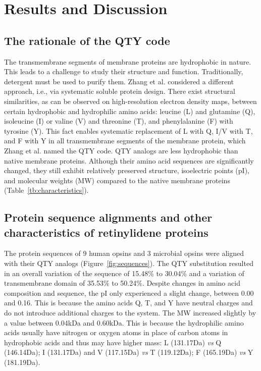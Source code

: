 \documentclass[fleqn, 10pt]{manuscript}
\begin{document}
\section*{Results and Discussion}

\subsection*{The rationale of the QTY code}

The transmembrane segments of membrane proteins are hydrophobic in nature. This leads to a challenge to study their structure and function. Traditionally, detergent must be used to purify them. Zhang et al. considered a different approach, i.e., via systematic soluble protein design. There exist structural similarities, as can be observed on high-resolution electron density maps, between certain hydrophobic and hydrophilic amino acids: leucine (L) and glutamine (Q), isoleucine (I) or valine (V) and threonine (T), and phenylalanine (F) with tyrosine (Y). This fact enables systematic replacement of L with Q, I/V with T, and F with Y in all transmembrane segments of the membrane protein, which Zhang et al. named the QTY code. QTY analogs are less hydrophobic than native membrane proteins. Although their amino acid sequences are significantly changed, they still exhibit relatively preserved structure, isoelectric points (pI), and molecular weights (MW) compared to the native membrane proteins (Table~\ref{tb:characteristics}). 

\subsection*{Protein sequence alignments and other characteristics of retinylidene proteins}

The protein sequences of 9 human opsins and 3 microbial opsins were aligned with their QTY analogs (Figure~\ref{fig:sequences}). The QTY substitution resulted in an overall variation of the sequence of 15.48\% to 30.04\% and a variation of transmembrane domain of 35.53\% to 50.24\%. Despite changes in amino acid composition and sequence, the pI only experienced a slight change, between 0.00 and 0.16. This is because the amino acids Q, T, and Y have neutral charges and do not introduce additional charges to the system.  The MW increased slightly by a value between 0.04kDa and 0.60kDa. This is because the hydrophilic amino acids usually have nitrogen or oxygen atoms in place of carbon atoms in hydrophobic acids and thus may have higher mass: L (131.17Da) \textit{vs} Q (146.14Da); I (131.17Da) and V (117.15Da) \textit{vs} T (119.12Da); F (165.19Da) \textit{vs} Y (181.19Da). 
\end{document}
